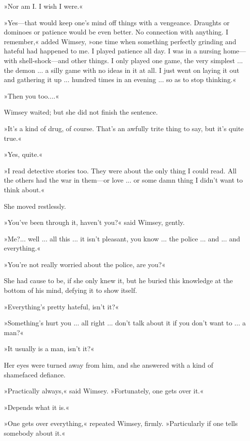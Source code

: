 »Nor am I. I wish I were.«

»Yes\allowbreak---\allowbreak that would keep one's mind off things with a vengeance. Draughts or dominoes or patience would be even better. No connection with anything. I remember,« added Wimsey, »one time when something perfectly grinding and hateful had happened to me. I played patience all day. I was in a nursing home\allowbreak---\allowbreak with shell-shock\allowbreak---\allowbreak and other things. I only played one game, the very simplest ... the demon ... a silly game with no ideas in it at all. I just went on laying it out and gathering it up ... hundred times in an evening ... so as to stop thinking.«

»Then you too....«

Wimsey waited; but she did not finish the sentence.

»It's a kind of drug, of course. That's an awfully trite thing to say, but it's quite true.«

»Yes, quite.«

»I read detective stories too. They were about the only thing I could read. All the others had the war in them\allowbreak---\allowbreak or love ... or some damn thing I didn't want to think about.«

She moved restlessly.

»You've been through it, haven't you?« said Wimsey, gently.

»Me?... well ... all this ... it isn't pleasant, you know ... the police ... and ... and everything.«

»You're not really worried about the police, are you?«

She had cause to be, if she only knew it, but he buried this knowledge at the bottom of his mind, defying it to show itself.

»Everything's pretty hateful, isn't it?«

»Something's hurt you ... all right ... don't talk about it if you don't want to ... a man?«

»It usually is a man, isn't it?«

Her eyes were turned away from him, and she answered with a kind of shamefaced defiance.

»Practically always,« said Wimsey. »Fortunately, one gets over it.«

»Depends what it is.«

»One gets over everything,« repeated Wimsey, firmly. »Particularly if one tells somebody about it.«

